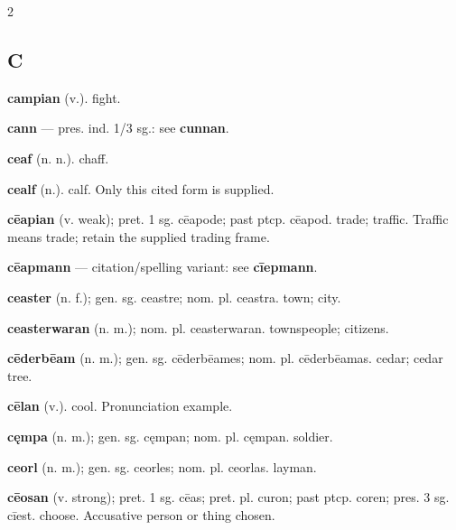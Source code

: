 \begin{multicols*}{2}
\subsection*{C}
\textbf{campian} (v.). fight.\par
\textbf{cann} — pres. ind. 1/3 sg.: see \textbf{cunnan}.\par
\textbf{ceaf} (n. n.). chaff.\par
\textbf{cealf} (n.). calf. Only this cited form is supplied.\par
\textbf{cēapian} (v. weak); pret. 1 sg. cēapode; past ptcp. cēapod. trade; traffic. Traffic means trade; retain the supplied trading frame.\par
\textbf{cēapmann} — citation/spelling variant: see \textbf{cīepmann}.\par
\textbf{ceaster} (n. f.); gen. sg. ceastre; nom. pl. ceastra. town; city.\par
\textbf{ceasterwaran} (n. m.); nom. pl. ceasterwaran. townspeople; citizens.\par
\textbf{cēderbēam} (n. m.); gen. sg. cēderbēames; nom. pl. cēderbēamas. cedar; cedar tree.\par
\textbf{cēlan} (v.). cool. Pronunciation example.\par
\textbf{cęmpa} (n. m.); gen. sg. cęmpan; nom. pl. cęmpan. soldier.\par
\textbf{ceorl} (n. m.); gen. sg. ceorles; nom. pl. ceorlas. layman.\par
\textbf{cēosan} (v. strong); pret. 1 sg. cēas; pret. pl. curon; past ptcp. coren; pres. 3 sg. cīest. choose. Accusative person or thing chosen.\par

\end{multicols*}
